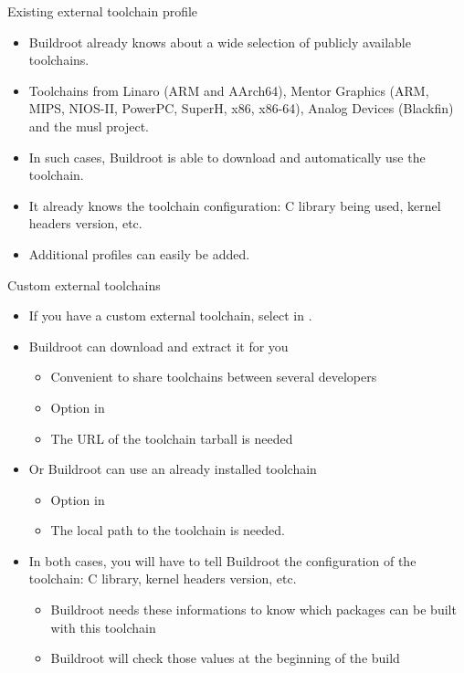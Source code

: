 \begin{frame}{Existing external toolchain profile}
  \begin{itemize}
  \item Buildroot already knows about a wide selection of publicly
    available toolchains.
  \item Toolchains from Linaro (ARM and AArch64), Mentor Graphics
    (ARM, MIPS, NIOS-II, PowerPC, SuperH, x86, x86-64), Analog Devices
    (Blackfin) and the musl project.
  \item In such cases, Buildroot is able to download and automatically
    use the toolchain.
  \item It already knows the toolchain configuration: C library being
    used, kernel headers version, etc.
  \item Additional profiles can easily be added.
  \end{itemize}
\end{frame}

\begin{frame}{Custom external toolchains}
  \begin{itemize}
  \item If you have a custom external toolchain, select  in .
  \item Buildroot can download and extract it for you
    \begin{itemize}
    \item Convenient to share toolchains between several
      developers
    \item Option  in 
    \item The URL of the toolchain tarball is needed
    \end{itemize}
  \item Or Buildroot can use an already installed toolchain
    \begin{itemize}
    \item Option  in 
    \item The local path to the toolchain is needed.
    \end{itemize}
  \item In both cases, you will have to tell Buildroot the
    configuration of the toolchain: C library, kernel headers version,
    etc.
    \begin{itemize}
    \item Buildroot needs these informations to know which packages
      can be built with this toolchain
    \item Buildroot will check those values at the beginning of the
      build
    \end{itemize}
  \end{itemize}
\end{frame}

